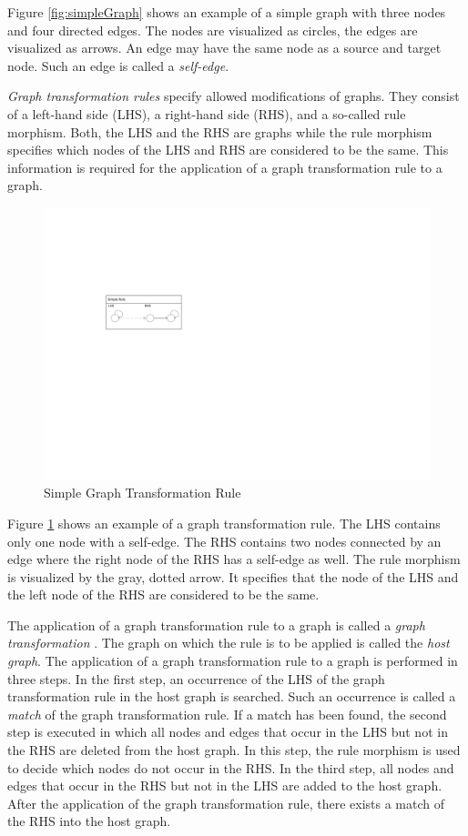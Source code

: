 Figure \ref{fig:simpleGraph} shows an example of a simple graph with three nodes and four directed edges. The nodes are visualized as circles, the edges are visualized as arrows. An edge may have the same node as a source and target node. Such an edge is called a \emph{self-edge}. 

\emph{Graph transformation rules} specify allowed modifications of graphs. They consist of a left-hand side (LHS), a right-hand side (RHS), and a so-called rule morphism. Both, the LHS and the RHS are graphs while the rule morphism specifies which nodes of the LHS and RHS are considered to be the same. This information is required for the application of a graph transformation rule to a graph.

\begin{figure}[htbp]
  \centering
  \includegraphics[scale=1.5]{figures/SimpleGTRule}
  \caption{Simple Graph Transformation Rule}
  \label{fig:simpleGTRule}
\end{figure}

Figure \ref{fig:simpleGTRule} shows an example of a graph transformation rule. The LHS contains only one node with a self-edge. The RHS contains two nodes connected by an edge where the right node of the RHS has a self-edge as well. The rule morphism is visualized by the gray, dotted arrow. It specifies that the node of the LHS and the left node of the RHS are considered to be the same.

The application of a graph transformation rule to a graph is called a \emph{graph transformation} \cite{EEPT06}. The graph on which the rule is to be applied is called the \emph{host graph}.
The application of a graph transformation rule to a graph is performed in three steps. In the first step, an occurrence of the LHS of the graph transformation rule in the host graph is searched. Such an occurrence is called a \emph{match} of the graph transformation rule. If a match has been found, the second step is executed in which all nodes and edges that occur in the LHS but not in the RHS are deleted from the host graph. In this step, the rule morphism is used to decide which nodes do not occur in the RHS. In the third step, all nodes and edges that occur in the RHS but not in the LHS are added to the host graph. After the application of the graph transformation rule, there exists a match of the RHS into the host graph.

